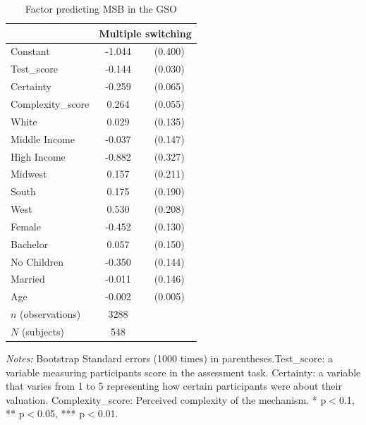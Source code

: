\documentclass[12pt]{article}
\newcommand{\sym}[1]{\rlap{$^{#1}$}}
\begin{document}
\begin{table}[H]
        \centering
        \caption{Factor predicting MSB  in the GSO}    
        \label{tab:MSB_predictor1}
      \begin{tabular}{l*{1}{cc}}
      \hline \hline
            &\multicolumn{2}{c}{Multiple switching}    \\
            \hline
Constant    &      -1.044\sym{***}&     (0.400)\\
Test\_score  &      -0.144\sym{***}&     (0.030)\\
Certainty     &      -0.259\sym{***}&     (0.065)\\
Complexity\_score&       0.264\sym{***}&     (0.055)\\
White       &       0.029         &     (0.135)\\
Middle Income&      -0.037         &     (0.147)\\
High Income &      -0.882\sym{***}&     (0.327)\\
Midwest     &       0.157         &     (0.211)\\
South       &       0.175         &     (0.190)\\
West        &       0.530\sym{**} &     (0.208)\\
Female      &      -0.452\sym{***}&     (0.130)\\
Bachelor    &       0.057         &     (0.150)\\
No Children &      -0.350\sym{**} &     (0.144)\\
Married     &      -0.011         &     (0.146)\\
Age         &      -0.002         &     (0.005)\\
\hline
\(n\) (observations)      &        3288         &            \\
\(N\) (subjects)       &        548         &            \\
\hline \hline
\end{tabular}

\begin{tablenotes}
            \footnotesize
         \item \textit{Notes:} Bootstrap Standard errors (1000 times) in parentheses.Test\_score: a variable measuring participants score in the assessment task. Certainty: a variable that varies from 1 to 5 representing how certain participants were about their valuation. Complexity\_score: Perceived complexity of the mechanism. * p$<$0.1, ** p$<$0.05, *** p$<$0.01.
        \end{tablenotes}
\end{table}
\end{document}
